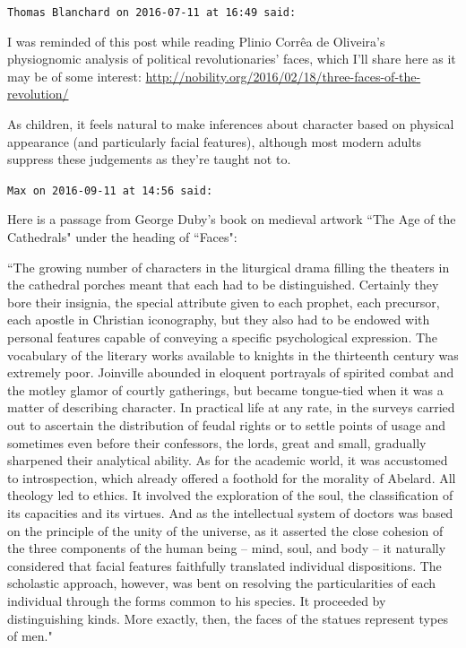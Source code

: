 \begin{footnotesize}
\begin{sffamily}
\texttt{Thomas Blanchard on 2016-07-11 at 16:49 said: }

I was reminded of this post while reading Plinio Corrêa de Oliveira's physiognomic analysis of political revolutionaries' faces, which I'll share here as it may be of some interest: \url{http://nobility.org/2016/02/18/three-faces-of-the-revolution/}

As children, it feels natural to make inferences about character based on physical appearance (and particularly facial features), although most modern adults suppress these judgements as they're taught not to.


\hfill

\texttt{Max on 2016-09-11 at 14:56 said: }

Here is a passage from George Duby's book on medieval artwork ``The Age of the Cathedrals" under the heading of ``Faces":

``The growing number of characters in the liturgical drama filling the theaters in the cathedral porches meant that each had to be distinguished. Certainly they bore their insignia, the special attribute given to each prophet, each precursor, each apostle in Christian iconography, but they also had to be endowed with personal features capable of conveying a specific psychological expression. The vocabulary of the literary works available to knights in the thirteenth century was extremely poor. Joinville abounded in eloquent portrayals of spirited combat and the motley glamor of courtly gatherings, but became tongue-tied when it was a matter of describing character. In practical life at any rate, in the surveys carried out to ascertain the distribution of feudal rights or to settle points of usage and sometimes even before their confessors, the lords, great and small, gradually sharpened their analytical ability. As for the academic world, it was accustomed to introspection, which already offered a foothold for the morality of Abelard. All theology led to ethics. It involved the exploration of the soul, the classification of its capacities and its virtues. And as the intellectual system of doctors was based on the principle of the unity of the universe, as it asserted the close cohesion of the three components of the human being – mind, soul, and body – it naturally considered that facial features faithfully translated individual dispositions. The scholastic approach, however, was bent on resolving the particularities of each individual through the forms common to his species. It proceeded by distinguishing kinds. More exactly, then, the faces of the statues represent types of men."


\end{sffamily}
\end{footnotesize}
